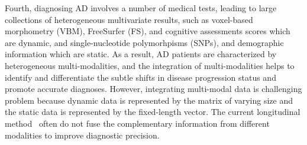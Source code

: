 Fourth, diagnosing AD involves a number of medical tests, leading to large collections of heterogeneous multivariate results, such as voxel-based morphometry (VBM), FreeSurfer (FS), and cognitive assessments scores which are dynamic, and single-nucleotide polymorhpisms (SNPs), and demographic information which are static.
As a result, AD patients are characterized by heterogeneous multi-modalities, and the integration of multi-modalities helps to identify and differentiate the subtle shifts in disease progression status and promote accurate diagnoses. 
However, integrating multi-modal data is challenging problem because dynamic data is represented by the matrix of varying size and the static data is represented by the fixed-length vector. The current longitudinal method~\cite{wang2016prediction,langkvist2014review,srivastava2015unsupervised} often do not fuse the complementary information from different modalities to improve diagnostic precision.


